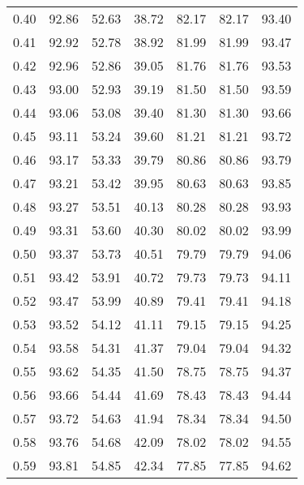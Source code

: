 \begin{tabular}{|c|c|c|c|c|c|c|}
      0.40 &     92.86 &     52.63 &      38.72 &   82.17 &      82.17 &         93.40 \\
      0.41 &     92.92 &     52.78 &      38.92 &   81.99 &      81.99 &         93.47 \\
      0.42 &     92.96 &     52.86 &      39.05 &   81.76 &      81.76 &         93.53 \\
      0.43 &     93.00 &     52.93 &      39.19 &   81.50 &      81.50 &         93.59 \\
      0.44 &     93.06 &     53.08 &      39.40 &   81.30 &      81.30 &         93.66 \\
      0.45 &     93.11 &     53.24 &      39.60 &   81.21 &      81.21 &         93.72 \\
      0.46 &     93.17 &     53.33 &      39.79 &   80.86 &      80.86 &         93.79 \\
      0.47 &     93.21 &     53.42 &      39.95 &   80.63 &      80.63 &         93.85 \\
      0.48 &     93.27 &     53.51 &      40.13 &   80.28 &      80.28 &         93.93 \\
      0.49 &     93.31 &     53.60 &      40.30 &   80.02 &      80.02 &         93.99 \\
      0.50 &     93.37 &     53.73 &      40.51 &   79.79 &      79.79 &         94.06 \\
      0.51 &     93.42 &     53.91 &      40.72 &   79.73 &      79.73 &         94.11 \\
      0.52 &     93.47 &     53.99 &      40.89 &   79.41 &      79.41 &         94.18 \\
      0.53 &     93.52 &     54.12 &      41.11 &   79.15 &      79.15 &         94.25 \\
      0.54 &     93.58 &     54.31 &      41.37 &   79.04 &      79.04 &         94.32 \\
      0.55 &     93.62 &     54.35 &      41.50 &   78.75 &      78.75 &         94.37 \\
      0.56 &     93.66 &     54.44 &      41.69 &   78.43 &      78.43 &         94.44 \\
      0.57 &     93.72 &     54.63 &      41.94 &   78.34 &      78.34 &         94.50 \\
      0.58 &     93.76 &     54.68 &      42.09 &   78.02 &      78.02 &         94.55 \\
      0.59 &     93.81 &     54.85 &      42.34 &   77.85 &      77.85 &         94.62 \\

\end{tabular}
